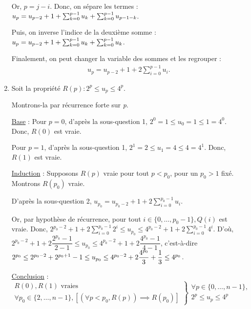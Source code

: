 \documentclass[12pt,a4paper]{article}
\begin{document}
\begin{enumerate}
	Or, $p=j-i$. Donc, on s\'epare les termes : $\\u_p=u_{p-2}+1+\sum_{k=0}^{p-1}{u_{k}}+\sum_{k=0}^{p-1}{u_{p-1-k}}$. 
	
	Puis, on inverse l'indice de la deuxi\`eme somme : $\\u_p=u_{p-2}+1+\sum_{k=0}^{p-1}{u_{k}}+\sum_{k=0}^{p-1}{u_{k}}$. 
	
	Finalement, on peut changer la variable des sommes et les regrouper : 
	\begin{gather*}
	u_p=u_{p-2}+1+2\sum_{i=0}^{p-1}{u_{i}}.
	\tag*{$\square$}
	\end{gather*}
	
	\item Soit la propri\'et\'e \( R(p): 2^p \leq u_p \leq 4^p \). 
	
	Montrons-la par r\'ecurrence forte sur {\itshape p}.
	
	\underline{Base} : Pour \( p = 0\), d'apr\`es la sous-question 1, \( 2^0 = 1 \leq u_0 = 1 \leq 1 = 4^0 \). Donc, \( R(0) \) est vraie.
	
	Pour \( p = 1\), d'apr\`es la sous-question 1, \( 2^1 = 2 \leq u_1 = 4 \leq 4 = 4^1 \). Donc, \( R(1) \) est vraie.
	
	\underline{Induction} : Supposons \( R(p) \) vraie pour tout \( p < p_0 \), pour un \( p_0 > 1 \) fix\'e. Montrons \( R(p_0) \) vraie.
	
	D'apr\`es la sous-question 2, \( u_{p_0} = u_{p_0-2} + 1 + 2\sum_{i=0}^{p_0-1}{u_i} \). 
	
	Or, par hypoth\`ese de r\'ecurrence, pour tout \( i \in \{0,\dotsc,p_0-1 \}, Q(i) \) est vraie. Donc, \( 2^{p_0-2} + 1 + 2\sum_{i=0}^{p_0-1}{2^i} \leq u_{p_0} \leq 4^{p_0-2} + 1 + 2\sum_{i=0}^{p_0-1}{4^i} \). D'o\`u, \( 2^{p_0-2} + 1 + 2\dfrac{2^{p_0}-1}{2-1} \leq u_{p_0} \leq 4^{p_0-2} + 1 + 2\dfrac{4^{p_0}-1}{4-1} \), c'est-\`a-dire \(\\ 2^{p_0} \leq 2^{p_0-2} + 2^{p_0+1} - 1 \leq u_{p_0} \leq 4^{p_0-2} + 2\dfrac{4^{p_0}}{3} + \dfrac{1}{3} \leq 4^{p_0}  \).
	
	\underline{Conclusion} : 
	\begin{equation*}
\left .\begin{array}{l}
R(0), R(1) \text{ vraies } \\
\forall p_0 \in \{2,\dotsc, n-1\}, [(\forall p < p_0, R(p)) \implies R(p_0) ]
\end{array} \right \}
\left .\begin{array}{l}
\forall p \in \{0,\dotsc, n-1\}, \\
2^p \leq u_p \leq 4^p
\end{array}\right .
\end{equation*}


\end{enumerate}
\end{document}

